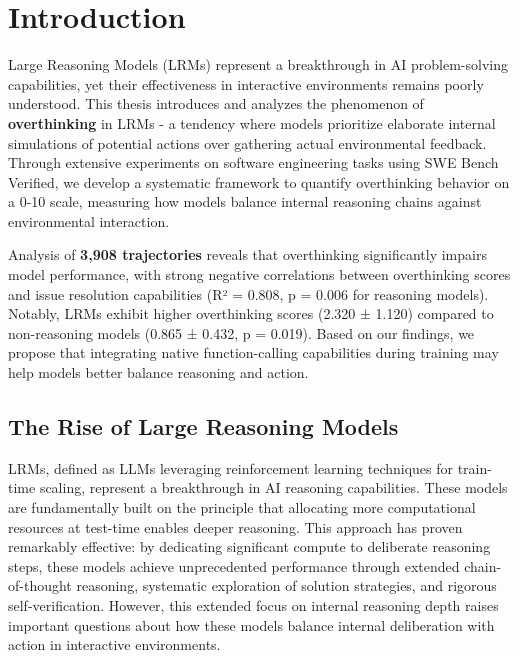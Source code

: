 \chapter{Introduction}
\label{intro}

Large Reasoning Models (LRMs) represent a breakthrough in AI problem-solving capabilities, yet their effectiveness in interactive environments remains poorly understood. This thesis introduces and analyzes the phenomenon of \textbf{overthinking} in LRMs - a tendency where models prioritize elaborate internal simulations of potential actions over gathering actual environmental feedback. Through extensive experiments on software engineering tasks using SWE Bench Verified, we develop a systematic framework to quantify overthinking behavior on a 0-10 scale, measuring how models balance internal reasoning chains against environmental interaction.

Analysis of \textbf{3,908 trajectories} reveals that overthinking significantly impairs model performance, with strong negative correlations between overthinking scores and issue resolution capabilities (R² = 0.808, p = 0.006 for reasoning models). Notably, LRMs exhibit higher overthinking scores (2.320 ± 1.120) compared to non-reasoning models (0.865 ± 0.432, p = 0.019). Based on our findings, we propose that integrating native function-calling capabilities during training may help models better balance reasoning and action.

\section{The Rise of Large Reasoning Models}
LRMs, defined as LLMs leveraging reinforcement learning techniques for train-time scaling, represent a breakthrough in AI reasoning capabilities. These models are fundamentally built on the principle that allocating more computational resources at test-time enables deeper reasoning. This approach has proven remarkably effective: by dedicating significant compute to deliberate reasoning steps, these models achieve unprecedented performance through extended chain-of-thought reasoning, systematic exploration of solution strategies, and rigorous self-verification. However, this extended focus on internal reasoning depth raises important questions about how these models balance internal deliberation with action in interactive environments.

